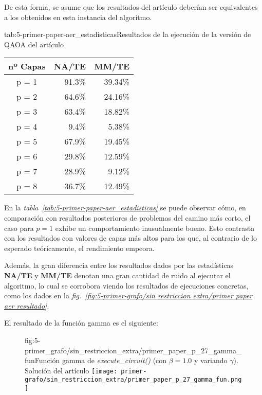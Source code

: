 De esta forma, se asume que los resultados del artículo deberían ser equivalentes a los obtenidos en esta instancia del algoritmo.

\begin{table}[Resultados QAOA {--} artículo de Urgelles \textit{et al.} (2022) {--} solución del artículo]{tab:5-primer-paper-aer_estadisticas}{Resultados de la ejecución de la versión de QAOA del artículo\cite{multi-objective_routing_optimization}}
  \centering
  \begin{tabular}{|c|r|r|}
    \hline
    \textbf{nº Capas} & \textbf{NA/TE} & \textbf{MM/TE} \\ \hline
    p = 1 & 91.3\% & 39.34\% \\ \hline
    p = 2 & 64.6\% & 24.16\% \\ \hline
    p = 3 & 63.4\% & 18.82\% \\ \hline
    p = 4 &  9.4\% &  5.38\% \\ \hline
    p = 5 & 67.9\% & 19.45\% \\ \hline
    p = 6 & 29.8\% & 12.59\% \\ \hline
    p = 7 & 28.9\% &  9.12\% \\ \hline
    p = 8 & 36.7\% & 12.49\% \\ \hline
  \end{tabular}
\end{table}

En la \textit{tabla~\ref{tab:5-primer-paper-aer_estadisticas}} se puede observar cómo, en comparación con resultados posteriores de problemas del camino más corto, el caso para $p = 1$ exhibe un comportamiento inusualmente bueno.
Esto contrasta con los resultados con valores de capas más altos para los que, al contrario de lo esperado teóricamente, el rendimiento empeora.

Además, la gran diferencia entre los resultados dados por las estadísticas \textbf{NA/TE} y \textbf{MM/TE} denotan una gran cantidad de ruido al ejecutar el algoritmo, lo cual se corrobora viendo los resultados de ejecuciones concretas, como los dados en la \textit{fig.~\ref{fig:5-primer-grafo/sin restriccion extra/primer paper aer resultado}}.

El resultado de la función gamma es el siguiente:
\begin{figure}[Resultados QAOA {--} artículo de Urgelles \textit{et al.} (2022) {--} función gamma de la solución del artículo]{fig:5-primer_grafo/sin_restriccion_extra/primer_paper_p_27_gamma_fun}{Función gamma de \textit{execute\_circuit()} (con $\beta = 1.0$ y variando $\gamma$). Solución del artículo\cite{multi-objective_routing_optimization}}
  \centering
  \texttt{[image: primer-grafo/sin\_restriccion\_extra/primer\_paper\_p\_27\_gamma\_fun.png]}
\end{figure}

